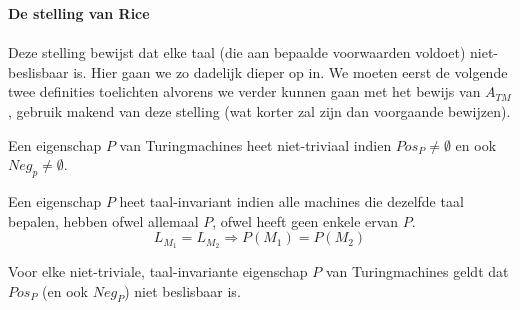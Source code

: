 \documentclass[
10pt,
a4paper,
oneside,
headinclude,footinclude, 
BCOR5mm,
]{scrartcl}
\begin{document}
\textbf{De stelling van Rice} \vspace{-1mm} \\ \\
Deze stelling bewijst dat elke taal (die aan bepaalde voorwaarden voldoet) niet-beslisbaar is. Hier gaan we zo dadelijk dieper op in. We moeten eerst de volgende twee definities toelichten alvorens we verder kunnen gaan met het bewijs van $A_{TM}$, gebruik makend van deze stelling (wat korter zal zijn dan voorgaande bewijzen).

\begin{theorem}
	Een eigenschap $P$ van Turingmachines heet niet-triviaal indien $Pos_P \neq \emptyset$ en ook $Neg_p \neq \emptyset$.
\end{theorem}

\begin{theorem}
	Een eigenschap $P$ heet taal-invariant indien alle machines die dezelfde taal bepalen, hebben ofwel allemaal $P$, ofwel heeft geen enkele ervan $P$. \\
	 $$L_{M_1} = L_{M_2} \Rightarrow P(M_1) = P(M_2)$$
\end{theorem}

\begin{theorem}
	Voor elke niet-triviale, taal-invariante eigenschap $P$ van Turingmachines geldt dat $Pos_P$ (en ook $Neg_P$) niet beslisbaar is.
\end{theorem}
\end{document}
